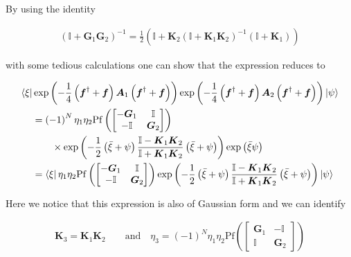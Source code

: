 \documentclass{article}
\begin{document}
	By using the identity
	
	\begin{align}
		\left(\mathbb{I} + \boldsymbol{G}_{1}\boldsymbol{G}_{2}\right)^{-1} =  \frac{1}{2}\left(\mathbb{I} + \boldsymbol{K}_{2}\left(\mathbb{I} + \boldsymbol{K}_{1}\boldsymbol{K}_{2} \right)^{-1}\left(\mathbb{I} + \boldsymbol{K}_{1} \right) \right) 
	\end{align}
	
	with some tedious calculations one can show that the expression reduces to
	
	
	
	\begin{align}
		\bra{\xi} &\exp \left( -\frac{1}{4}\left( \boldsymbol{f}^\dagger + \boldsymbol{f} \right) \boldsymbol{A}_{1} \left( \boldsymbol{f}^\dagger + \boldsymbol{f} \right) \right) \exp \left( -\frac{1}{4}\left( \boldsymbol{f}^\dagger + \boldsymbol{f} \right) \boldsymbol{A}_{2} \left( \boldsymbol{f}^\dagger + \boldsymbol{f} \right) \right) \ket{\psi} \nonumber \\
		&=\left(-1\right)^{N}\eta_1\eta_2\mathrm{Pf} \left(\begin{bmatrix}
			-\boldsymbol{G}_{1} & \mathbb{I} \\
			-\mathbb{I} & \boldsymbol{G}_{2} 
		\end{bmatrix} \right) \nonumber \\
		&\quad\quad\times \exp \left( -\frac{1}{2}\left(\bar{\xi} + \psi \right) \frac{\mathbb{I} - \boldsymbol{K}_{1}\boldsymbol{K}_{2} }{\mathbb{I} + \boldsymbol{K}_{1}\boldsymbol{K}_{2} } \left(\bar{\xi} + \psi\right)   \right) \exp \left( \bar{\xi}\psi \right) \nonumber \\
		&= \bra{\xi}  \eta_1\eta_2\mathrm{Pf} \left(\begin{bmatrix}
			-\boldsymbol{G}_{1} & \mathbb{I} \\
			-\mathbb{I} & \boldsymbol{G}_{2} 
		\end{bmatrix} \right) \exp \left( -\frac{1}{2}\left(\bar{\xi} + \psi \right) \frac{\mathbb{I} - \boldsymbol{K}_{1}\boldsymbol{K}_{2} }{\mathbb{I} + \boldsymbol{K}_{1}\boldsymbol{K}_{2} } \left(\bar{\xi} + \psi\right)   \right) \ket{\psi}
	\end{align}
	
	Here we notice that this expression is also of Gaussian form and we can identify
	
	\begin{align}
		\boldsymbol{K}_{3} = \boldsymbol{K}_{1}\boldsymbol{K}_{2}\quad\quad \text{and} \quad \eta_{3} = \left(-1\right)^{N} \eta_{1}\eta_{2}\mathrm{Pf} \left(\begin{bmatrix}
			\boldsymbol{G}_{1} & -\mathbb{I} \\
			\mathbb{I} & \boldsymbol{G}_{2}
		\end{bmatrix} \right) 
	\end{align}
	
\end{document}
